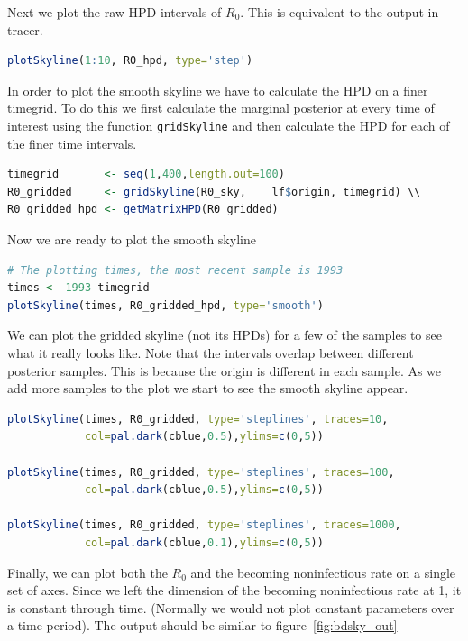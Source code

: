 \documentclass[11pt]{article}
\begin{document}
Next we plot the raw HPD intervals of $R_0$. This is equivalent to the output in tracer. 

\begin{lstlisting}[language=R]
plotSkyline(1:10, R0_hpd, type='step')
\end{lstlisting}

In order to plot the smooth skyline we have to calculate the HPD on a finer timegrid. To do this we first calculate the marginal posterior at every time of interest using the function \texttt{gridSkyline} and then calculate the HPD for each of the finer time intervals. 

\begin{lstlisting}[language=R]
timegrid       <- seq(1,400,length.out=100) 
R0_gridded     <- gridSkyline(R0_sky,    lf$origin, timegrid) \\
R0_gridded_hpd <- getMatrixHPD(R0_gridded)
\end{lstlisting}

Now we are ready to plot the smooth skyline

\begin{lstlisting}[language=R]
# The plotting times, the most recent sample is 1993 
times <- 1993-timegrid 
plotSkyline(times, R0_gridded_hpd, type='smooth')
\end{lstlisting}


We can plot the gridded skyline (not its HPDs) for a few of the samples to see what it really looks like. Note that the intervals overlap between different posterior samples. This is because the origin is different in each sample. As we add more samples to the plot we start to see the smooth skyline appear. 

\begin{lstlisting}[language=R]
plotSkyline(times, R0_gridded, type='steplines', traces=10, 
			col=pal.dark(cblue,0.5),ylims=c(0,5)) 

plotSkyline(times, R0_gridded, type='steplines', traces=100, 
			col=pal.dark(cblue,0.5),ylims=c(0,5)) 

plotSkyline(times, R0_gridded, type='steplines', traces=1000, 
			col=pal.dark(cblue,0.1),ylims=c(0,5))
\end{lstlisting}

Finally, we can plot both the $R_0$ and the becoming noninfectious rate on a single set of axes. Since we left the dimension of the becoming noninfectious rate at 1, it is constant through time. (Normally we would not plot constant parameters over a time period). The output should be similar to figure~\ref{fig:bdsky_out}
\end{document}
